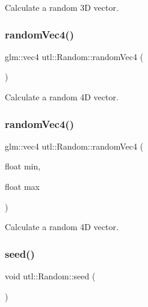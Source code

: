 Calculate a random 3D vector. \mbox{\label{classutl_1_1_random_abab1cbc6931823c0449b53210292527f}} 
\subsubsection{\texorpdfstring{random\+Vec4()}{randomVec4()}\hspace{0.1cm}{\footnotesize\ttfamily [1/2]}}
{\footnotesize\ttfamily glm\+::vec4 utl\+::\+Random\+::random\+Vec4 (\begin{DoxyParamCaption}{ }\end{DoxyParamCaption})\hspace{0.3cm}{\ttfamily [static]}}

Calculate a random 4D vector. \mbox{\label{classutl_1_1_random_a38f60c4bd2fca40f4392672d3876b17a}} 
\subsubsection{\texorpdfstring{random\+Vec4()}{randomVec4()}\hspace{0.1cm}{\footnotesize\ttfamily [2/2]}}
{\footnotesize\ttfamily glm\+::vec4 utl\+::\+Random\+::random\+Vec4 (\begin{DoxyParamCaption}\item[{float}]{min,  }\item[{float}]{max }\end{DoxyParamCaption})\hspace{0.3cm}{\ttfamily [static]}}

Calculate a random 4D vector. \mbox{\label{classutl_1_1_random_a49284e0d91bf8f039b03d811e848821f}} 
\subsubsection{\texorpdfstring{seed()}{seed()}\hspace{0.1cm}{\footnotesize\ttfamily [1/2]}}
{\footnotesize\ttfamily void utl\+::\+Random\+::seed (\begin{DoxyParamCaption}{ }\end{DoxyParamCaption})\hspace{0.3cm}{\ttfamily [static]}}

